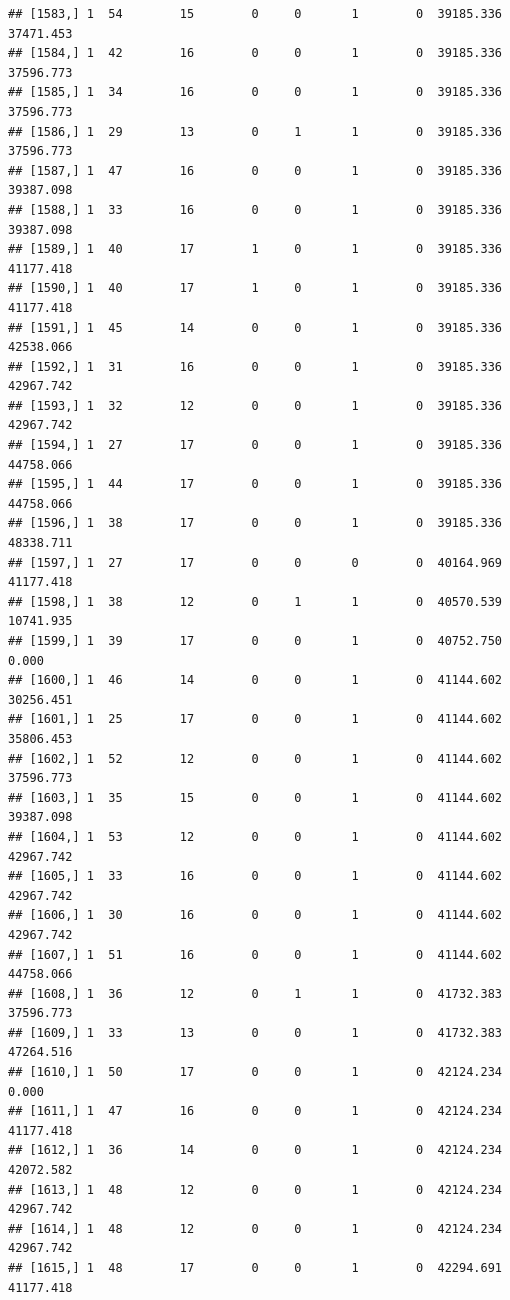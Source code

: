 \documentclass[
]{article}
\begin{document}
\begin{verbatim}
## [1583,] 1  54        15        0     0       1        0  39185.336  37471.453
## [1584,] 1  42        16        0     0       1        0  39185.336  37596.773
## [1585,] 1  34        16        0     0       1        0  39185.336  37596.773
## [1586,] 1  29        13        0     1       1        0  39185.336  37596.773
## [1587,] 1  47        16        0     0       1        0  39185.336  39387.098
## [1588,] 1  33        16        0     0       1        0  39185.336  39387.098
## [1589,] 1  40        17        1     0       1        0  39185.336  41177.418
## [1590,] 1  40        17        1     0       1        0  39185.336  41177.418
## [1591,] 1  45        14        0     0       1        0  39185.336  42538.066
## [1592,] 1  31        16        0     0       1        0  39185.336  42967.742
## [1593,] 1  32        12        0     0       1        0  39185.336  42967.742
## [1594,] 1  27        17        0     0       1        0  39185.336  44758.066
## [1595,] 1  44        17        0     0       1        0  39185.336  44758.066
## [1596,] 1  38        17        0     0       1        0  39185.336  48338.711
## [1597,] 1  27        17        0     0       0        0  40164.969  41177.418
## [1598,] 1  38        12        0     1       1        0  40570.539  10741.935
## [1599,] 1  39        17        0     0       1        0  40752.750      0.000
## [1600,] 1  46        14        0     0       1        0  41144.602  30256.451
## [1601,] 1  25        17        0     0       1        0  41144.602  35806.453
## [1602,] 1  52        12        0     0       1        0  41144.602  37596.773
## [1603,] 1  35        15        0     0       1        0  41144.602  39387.098
## [1604,] 1  53        12        0     0       1        0  41144.602  42967.742
## [1605,] 1  33        16        0     0       1        0  41144.602  42967.742
## [1606,] 1  30        16        0     0       1        0  41144.602  42967.742
## [1607,] 1  51        16        0     0       1        0  41144.602  44758.066
## [1608,] 1  36        12        0     1       1        0  41732.383  37596.773
## [1609,] 1  33        13        0     0       1        0  41732.383  47264.516
## [1610,] 1  50        17        0     0       1        0  42124.234      0.000
## [1611,] 1  47        16        0     0       1        0  42124.234  41177.418
## [1612,] 1  36        14        0     0       1        0  42124.234  42072.582
## [1613,] 1  48        12        0     0       1        0  42124.234  42967.742
## [1614,] 1  48        12        0     0       1        0  42124.234  42967.742
## [1615,] 1  48        17        0     0       1        0  42294.691  41177.418

\end{verbatim}
\end{document}
